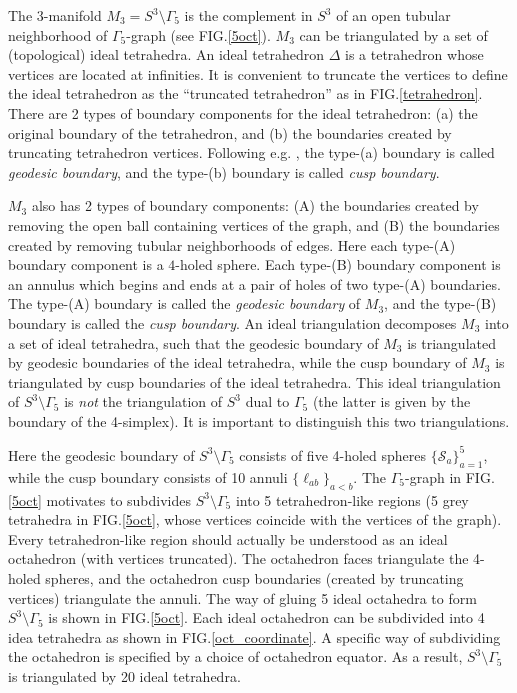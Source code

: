 \documentclass[aps,prd,notitlepage,nofootinbib,superscriptaddress,groupedaddress,twocolumn]{revtex4-1}
\newcommand{\cs}{\mathcal S}
\newcommand{\G}{\Gamma}
\begin{document}
The 3-manifold $M_3=S^3\setminus\G_5$ is the complement in $S^3$ of an open tubular neighborhood of $\G_5$-graph (see FIG.\ref{5oct}). $M_3$ can be triangulated by a set of (topological) ideal tetrahedra. An ideal tetrahedron $\Delta$ is a tetrahedron whose vertices are located at infinities. It is convenient to truncate the vertices to define the ideal tetrahedron as the ``truncated tetrahedron'' as in FIG.\ref{tetrahedron}. There are 2 types of boundary components for the ideal tetrahedron: (a) the original boundary of the tetrahedron, and (b) the boundaries created by truncating tetrahedron vertices. Following e.g. \cite{Dimofte2011,DGG11,DGV}, the type-(a) boundary is called \emph{geodesic boundary}, and the type-(b) boundary is called \emph{cusp boundary}. 



$M_3$ also has 2 types of boundary components: (A) the boundaries created by removing the open ball containing vertices of the graph, and (B) the boundaries created by removing tubular neighborhoods of edges. Here each type-(A) boundary component is a $4$-holed sphere. Each type-(B) boundary component is an annulus which begins and ends at a pair of holes of two type-(A) boundaries. The type-(A) boundary is called the \emph{geodesic boundary} of $M_3$, and the type-(B) boundary is called the \emph{cusp boundary}. An ideal triangulation decomposes $M_3$ into a set of ideal tetrahedra, such that the geodesic boundary of $M_3$ is triangulated by geodesic boundaries of the ideal tetrahedra, while the cusp boundary of $M_3$ is triangulated by cusp boundaries of the ideal tetrahedra. This ideal triangulation of $S^3\setminus\G_5$ is \emph{not} the triangulation of $S^3$ dual to $\G_5$ (the latter is given by the boundary of the 4-simplex). It is important to distinguish this two triangulations. 



Here the geodesic boundary of $S^3\setminus\G_5$ consists of five 4-holed spheres $\{\cs_a\}_{a=1}^5$, while the cusp boundary consists of 10 annuli $\{\ell_{ab}\}_{a<b}$. The $\G_5$-graph in FIG.\ref{5oct} motivates to subdivides $S^3\setminus\G_5$ into 5 tetrahedron-like regions (5 grey tetrahedra in FIG.\ref{5oct}, whose vertices coincide with the vertices of the graph). Every tetrahedron-like region should actually be understood as an ideal octahedron (with vertices truncated). The octahedron faces triangulate the 4-holed spheres, and the octahedron cusp boundaries (created by truncating vertices) triangulate the annuli. The way of gluing 5 ideal octahedra to form $S^3\setminus\G_5$ is shown in FIG.\ref{5oct}. Each ideal octahedron can be subdivided into 4 idea tetrahedra as shown in FIG.\ref{oct_coordinate}. A specific way of subdividing the octahedron is specified by a choice of octahedron equator. As a result, $S^3\setminus\G_5$ is triangulated by 20 ideal tetrahedra. 
\end{document}

